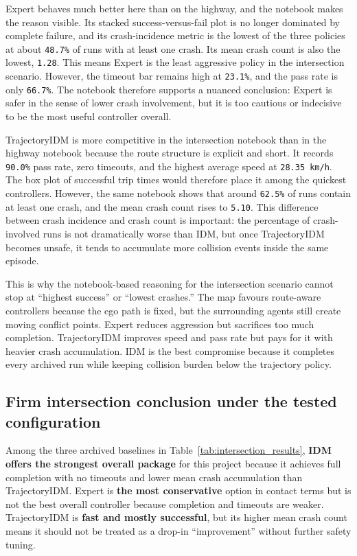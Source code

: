 \documentclass[12pt,a4paper]{report}
\begin{document}
Expert behaves much better here than on the highway, and the notebook makes the reason visible. Its stacked success-versus-fail plot is no longer dominated by complete failure, and its crash-incidence metric is the lowest of the three policies at about \texttt{48.7\%} of runs with at least one crash. Its mean crash count is also the lowest, \texttt{1.28}. This means Expert is the least aggressive policy in the intersection scenario. However, the timeout bar remains high at \texttt{23.1\%}, and the pass rate is only \texttt{66.7\%}. The notebook therefore supports a nuanced conclusion: Expert is safer in the sense of lower crash involvement, but it is too cautious or indecisive to be the most useful controller overall.

TrajectoryIDM is more competitive in the intersection notebook than in the highway notebook because the route structure is explicit and short. It records \texttt{90.0\%} pass rate, zero timeouts, and the highest average speed at \texttt{28.35 km/h}. The box plot of successful trip times would therefore place it among the quickest controllers. However, the same notebook shows that around \texttt{62.5\%} of runs contain at least one crash, and the mean crash count rises to \texttt{5.10}. This difference between crash incidence and crash count is important: the percentage of crash-involved runs is not dramatically worse than IDM, but once TrajectoryIDM becomes unsafe, it tends to accumulate more collision events inside the same episode.

This is why the notebook-based reasoning for the intersection scenario cannot stop at ``highest success'' or ``lowest crashes.'' The map favours route-aware controllers because the ego path is fixed, but the surrounding agents still create moving conflict points. Expert reduces aggression but sacrifices too much completion. TrajectoryIDM improves speed and pass rate but pays for it with heavier crash accumulation. IDM is the best compromise because it completes every archived run while keeping collision burden below the trajectory policy.

\subsection{Firm intersection conclusion under the tested configuration}
Among the three archived baselines in Table~\ref{tab:intersection_results}, \textbf{IDM offers the strongest overall package} for this project because it achieves full completion with no timeouts and lower mean crash accumulation than TrajectoryIDM. Expert is \textbf{the most conservative} option in contact terms but is not the best overall controller because completion and timeouts are weaker. TrajectoryIDM is \textbf{fast and mostly successful}, but its higher mean crash count means it should not be treated as a drop-in ``improvement'' without further safety tuning.
\end{document}
